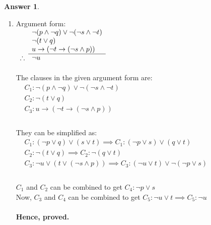 \documentclass[a4paper]{article}
\theoremstyle{definition}
\newtheorem{answer}{Answer}
\begin{document}
\begin{answer}
\begin{enumerate}
        \item Argument form:\\
        $\begin{array}{rl}
                        & \lnot(p \land \lnot q) \lor \lnot(\lnot s \land \lnot t) \\
                        & \lnot (t \lor q) \\
                        & u \rightarrow (\lnot t \rightarrow (\lnot s \land p))\\
                        \cline{2-2}
                        \therefore & \lnot u \\
        \end{array}$\\\\
        The clauses in the given argument form are:\\
        $\begin{array}{rl}
                        & C_1: \lnot(p \land \lnot q) \lor \lnot(\lnot s \land \lnot t) \\
                        & C_2: \lnot (t \lor q) \\
                        & C_3: u \rightarrow (\lnot t \rightarrow (\lnot s \land p))\\
        \end{array}$\\\\
        They can be simplified as:\\
        $\begin{array}{rl}
                        & C_1: (\lnot p \lor q) \lor (s \lor t) \implies C_1: (\lnot p \lor s) \lor (q \lor t)\\
                        & C_2: \lnot (t \lor q) \implies C_2: \lnot (q \lor t)\\
                        & C_3: \lnot u \lor (t \lor (\lnot s \land p)) \implies C_3: (\lnot u \lor t) \lor \lnot (\lnot p \lor s)\\
        \end{array}$\\\\
        $C_1$ and $C_2$ can be combined to get $C_4: \lnot p \lor s$\\
        Now, $C_3$ and $C_4$ can be combined to get $C_5: \lnot u \lor t \implies C_5: \lnot u$\\\\
        \textbf{Hence, proved.}
    \end{enumerate}
\end{answer}
\end{document}
